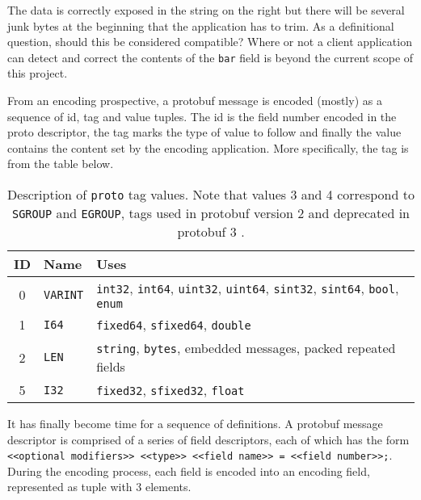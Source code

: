 \documentclass[11pt]{article}
\theoremstyle{definition}
\begin{document}
The data is correctly exposed in the string on the right but there will be
several junk bytes at the beginning that the application has to trim. As a
definitional question, should this be considered compatible? Where or not a
client application can detect and correct the contents of the \texttt{bar} field
is beyond the current scope of this project.

From an encoding prospective, a protobuf message is encoded (mostly) as a
sequence of id, tag and value tuples. The id is the field number encoded in the
proto descriptor, the tag marks the type of value to follow and finally the
value contains the content set by the encoding application. More specifically,
the tag is from the table below.

\begin{table}[H]
	\centering
	\begin{tabular}{cll}
		\toprule
		ID & Name            & Uses                                                 \\
		\midrule
		0  & \texttt{VARINT} & \texttt{int32}, \texttt{int64}, \texttt{uint32},
		\texttt{uint64}, \texttt{sint32}, \texttt{sint64},
		\texttt{bool}, \texttt{enum}                                                \\
		1  & \texttt{I64}    & \texttt{fixed64}, \texttt{sfixed64}, \texttt{double} \\
		2  & \texttt{LEN}    & \texttt{string}, \texttt{bytes}, embedded messages,
		packed repeated fields                                                      \\
		5  & \texttt{I32}    & \texttt{fixed32}, \texttt{sfixed32},
		\texttt{float}                                                              \\
		\bottomrule
	\end{tabular}

	\vspace{4mm}
	\caption[]{Description of \texttt{proto} tag values. Note that values 3 and
		4 correspond to \texttt{SGROUP} and \texttt{EGROUP}, tags used in protobuf
		version 2 and deprecated in protobuf 3 \autocite{Encoding}.}
    \label{tab:tags}
\end{table}

It has finally become time for a sequence of definitions. A protobuf message
descriptor is comprised of a series of field descriptors, each of which has the
form \texttt{<<optional modifiers>> <<type>> <<field name>> = <<field
	number>>;}. During the encoding process, each field is encoded into an
encoding field, represented as tuple with 3 elements.
\end{document}
